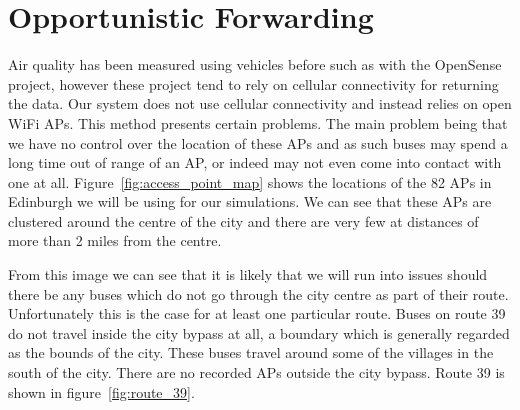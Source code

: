     \section{Opportunistic Forwarding}\label{data_gathering_performance_opportunistic_forwarding}

        Air quality has been measured using vehicles before such as with the OpenSense project, however these project tend to rely on cellular connectivity for returning the data. Our system does not use cellular connectivity and instead relies on open WiFi APs. This method presents certain problems. The main problem being that we have no control over the location of these APs and as such buses may spend a long time out of range of an AP, or indeed may not even come into contact with one at all. Figure~\ref{fig:access_point_map} shows the locations of the 82 APs in Edinburgh we will be using for our simulations. We can see that these APs are clustered around the centre of the city and there are very few at distances of more than 2 miles from the centre. 


        From this image we can see that it is likely that we will run into issues should there be any buses which do not go through the city centre as part of their route. Unfortunately this is the case for at least one particular route. Buses on route 39 do not travel inside the city bypass at all, a boundary which is generally regarded as the bounds of the city. These buses travel around some of the villages in the south of the city. There are no recorded APs outside the city bypass. Route 39 is shown in figure~\ref{fig:route_39}.


